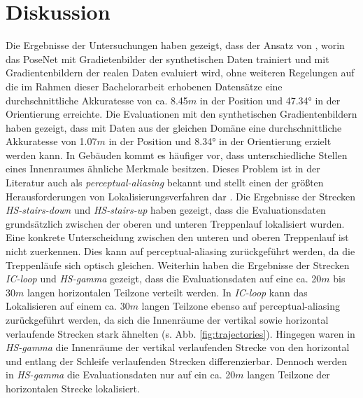 
\section{Diskussion}
\label{sec:kapitel_5}


Die Ergebnisse der Untersuchungen haben gezeigt, dass der Ansatz von \citet{acharyaBIMPoseNetIndoorCamera2019}, worin das PoseNet mit Gradietenbilder der synthetischen Daten trainiert und mit Gradientenbildern der realen Daten evaluiert wird, ohne weiteren Regelungen auf die im Rahmen dieser Bachelorarbeit erhobenen Datensätze eine durchschnittliche Akkuratesse von ca. 8.45$m$ in der Position und 47.34° in der Orientierung erreichte. Die Evaluationen mit den synthetischen Gradientenbildern haben gezeigt, dass mit Daten aus der gleichen Domäne eine durchschnittliche Akkuratesse von 1.07$m$ in der Position und 8.34° in der Orientierung erzielt werden kann. In Gebäuden kommt es häufiger vor, dass unterschiedliche Stellen eines Innenraumes ähnliche Merkmale besitzen. Dieses Problem ist in der Literatur auch als \textit{perceptual-aliasing} bekannt und stellt einen der größten Herausforderungen von Lokalisierungsverfahren dar \cite{lowryVisualPlaceRecognition2016}. Die Ergebnisse der Strecken \textit{HS-stairs-down} und \textit{HS-stairs-up} haben gezeigt, dass die Evaluationsdaten grundsätzlich zwischen der oberen und unteren Treppenlauf lokalisiert wurden. Eine konkrete Unterscheidung zwischen den unteren und oberen Treppenlauf ist nicht zuerkennen. Dies kann auf perceptual-aliasing zurückgeführt werden, da die Treppenläufe sich optisch gleichen. Weiterhin haben die Ergebnisse der Strecken \textit{IC-loop} und \textit{HS-gamma} gezeigt, dass die Evaluationsdaten auf eine ca. 20$m$ bis 30$m$ langen horizontalen Teilzone verteilt werden. In \textit{IC-loop} kann das Lokalisieren auf einem ca. 30$m$ langen Teilzone ebenso auf perceptual-aliasing zurückgeführt werden, da sich die Innenräume der vertikal sowie horizontal verlaufende Strecken stark ähnelten (s. Abb. \ref{fig:trajectories}). Hingegen waren in \textit{HS-gamma} die Innenräume der vertikal verlaufenden Strecke von den horizontal und entlang der Schleife verlaufenden Strecken differenzierbar. Dennoch werden in \textit{HS-gamma} die Evaluationsdaten nur auf ein ca. 20$m$ langen Teilzone der horizontalen Strecke lokalisiert.




